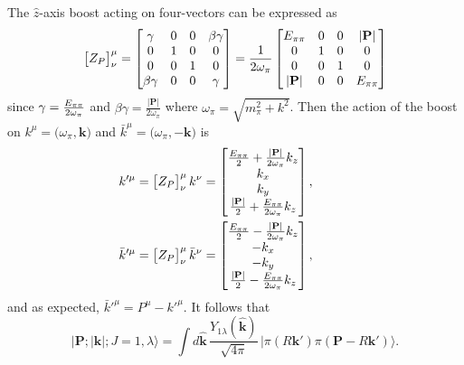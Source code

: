 {The $\hat{z}$-axis boost acting on four-vectors can be expressed as
\begin{equation}
	\big[ Z_P \big]^\mu_\nu = 
		\begin{bmatrix} 
			\gamma & 0 & 0 & \beta \gamma \\
			0 & 1 & 0 & 0 \\
			0 & 0 & 1 & 0 \\
			\beta \gamma & 0 & 0 & \gamma	
		\end{bmatrix}
		= \frac{1}{2 \omega_\pi}
		\begin{bmatrix} 
			E_{\pi\pi} & 0 & 0 & |\textbf{P}|\\
			0 & 1 & 0 & 0 \\
			0 & 0 & 1 & 0 \\
			|\textbf{P}| & 0 & 0 & E_{\pi\pi}	
		\end{bmatrix}
\end{equation}
since $\gamma = \frac{E_{\pi\pi}}{2\omega_\pi}$ and $\beta \gamma = \frac{|\textbf{P}|}{2 \omega_\pi}$ where $\omega_\pi = \sqrt{m_\pi^2 + k^2}$. Then the action of the boost on $k^\mu = \big(\omega_\pi, \textbf{k}\big)$ and ${\bar{k}^\mu = \big(\omega_\pi , -\textbf{k} \big)}$ is
\begin{align}
k'^\mu &= \big[ Z_P \big]^\mu_\nu \, k^\nu = 
	\begin{bmatrix} \tfrac{E_{\pi\pi}}{2} + \tfrac{|\textbf{P}|}{2\omega_\pi} k_z \\ k_x \\ k_y \\ \tfrac{|\textbf{P}|}{2} + \tfrac{E_{\pi\pi}}{2\omega_\pi} k_z \end{bmatrix},
	\quad \quad\quad\nonumber\\
\bar{k}'^\mu &= \big[ Z_P \big]^\mu_\nu \, \bar{k}^\nu = 
	\begin{bmatrix} \tfrac{E_{\pi\pi}}{2} - \tfrac{|\textbf{P}|}{2\omega_\pi} k_z \\ -k_x \\ -k_y \\ \tfrac{|\textbf{P}|}{2} - \tfrac{E_{\pi\pi}}{2\omega_\pi} k_z \end{bmatrix},	
\end{align}
and as expected, $\bar{k}'^\mu = P^\mu - k'^\mu$. It follows that 
\begin{equation}
\big| \textbf{P}; |\textbf{k}|; J=1, \lambda \big\rangle = \int \! d\hat{\mathbf{k}} \, \frac{Y_{1\lambda}(\hat{\mathbf{k}})}{\sqrt{4\pi}}\, \big| \pi(R\textbf{k}') \pi( \textbf{P} - R\textbf{k}') \big\rangle.
\end{equation}

}
